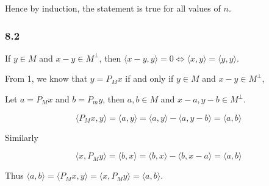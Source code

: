 \documentclass[11pt]{article}
\begin{document}
Hence by induction, the statement is true for all values of \(n\).
\subsubsection{8.2}
\label{sec:org46bf16d}
If \(y \in M\) and \(x - y \in M^{\perp}\), then \(\langle x - y, y \rangle = 0
    \iff \langle x, y \rangle = \langle y, y \rangle\).

From 1, we know that \(y = P_Mx\) if and only if \(y \in M\) and \(x - y \in
    M^\perp\),

Let \(a = P_M x\) and \(b = P_m y\), then \(a, b \in M\) and \(x-a, y-b \in
    M^\perp\).

$$\langle P_M x, y \rangle = \langle a, y \rangle = \langle a, y \rangle - \langle a, y - b \rangle =
    \langle a, b\rangle$$

Similarly

$$\langle x, P_M y \rangle = \langle b, x \rangle = \langle b, x \rangle - \langle b, x - a \rangle =
    \langle a, b\rangle$$

Thus \(\langle a, b \rangle = \langle P_M x, y \rangle = \langle x, P_M y
    \rangle = \langle a, b\rangle\).
\end{document}
